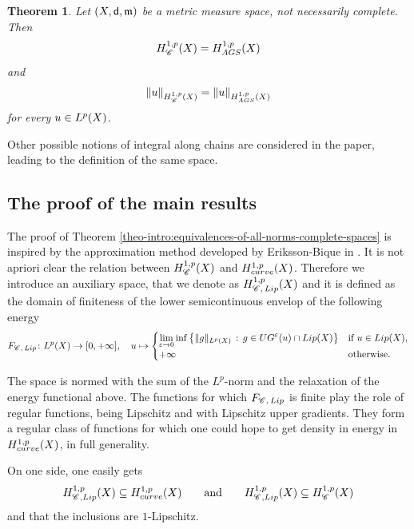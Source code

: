 \documentclass[12pt]{amsart}
\newcommand{\sfd}{{\sf d}}
\newcommand{\X}{{\rm X}}
\newcommand{\Lip}{{\rm Lip}}
\newcommand{\mm}{\mathfrak m}
\newcommand{\F}{{\rm F}}
\newtheorem{theorem}{Theorem}[section]
\theoremstyle{definition}
\newcommand{\Chain}[1]{\mathscr{C}^{#1}}
\newcommand{\UG}[1]{{\rm UG}^{#1}}
\newcommand{\HH}[2]{H^{1,#1}_{{\rm #2}}}
\renewcommand{\F}[1]{{\rm F}_{{\rm #1}}}
\begin{document}
\begin{theorem}
\label{theo-intro:equivalences-of-AGS-Chain}
    Let $(\X,\sfd,\mm)$ be a metric measure space, not necessarily complete. Then
    \begin{equation}
        \HH{p}{\Chain{}}(\X) = \HH{p}{AGS}(\X)
    \end{equation}
    and
    \begin{equation}
        \|u \|_{\HH{p}{\Chain{}}(\X)} = \|u \|_{\HH{p}{AGS}(\X)}
    \end{equation}
    for every $u\in L^p(\X)$.
\end{theorem}

Other possible notions of integral along chains are considered in the paper, leading to the definition of the same space.

\subsection{The proof of the main results}

The proof of Theorem \ref{theo-intro:equivalences-of-all-norms-complete-spaces}
is inspired by the approximation method developed by Eriksson-Bique in \cite{Eriksson-Bique-Density-in-energy}. It is not apriori clear the relation between $\HH{p}{\Chain{}}(\X)$ and $\HH{p}{curve}(\X)$. Therefore we introduce an auxiliary space, that we denote as $\HH{p}{\Chain{},\, \Lip}(\X)$ and it is defined as the domain of finiteness of the lower semicontinuous envelop of the following energy
\begin{equation}
        \F{\Chain{},\, \Lip} \colon L^{p}(\X) \to  [0,+\infty], \quad u \mapsto \begin{cases}
            \underset{\varepsilon\to 0}{\lim}\inf\left\{ \| g \|_{L^p(\X)}\,:\, g\in \UG{\varepsilon}(u) \cap {\rm Lip}(\X) \right\} &\text{if } u\in \Lip(\X),\\
            +\infty &\text{otherwise}.
        \end{cases}
\end{equation}

The space is normed with the sum of the $L^p$-norm and the relaxation of the energy functional above.
The functions for which $\F{\Chain{},\,\Lip}$ is finite play the role of regular functions, being Lipschitz and with Lipschitz upper gradients. They form a regular class of functions for which one could hope to get density in energy in $\HH{p}{curve}(\X)$, in full generality.

On one side, one easily gets 
\begin{equation}
\label{eq:trivial_inclusion_of_spaces}
    \HH{p}{\Chain{},\Lip}(\X)\subseteq\HH{p}{curve}(\X) \qquad\text{and}\qquad \HH{p}{\Chain{},\Lip}(\X)\subseteq\HH{p}{\Chain{}}(\X)
\end{equation}
and that the inclusions are $1$-Lipschitz.
\end{document}
